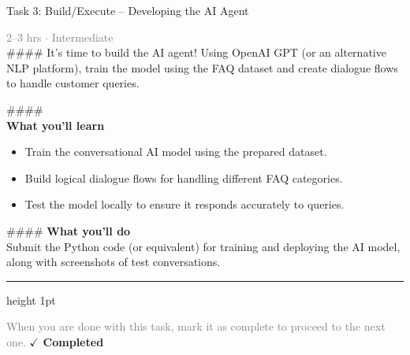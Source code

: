 \documentclass[10pt,a4paper]{article}
\begin{document}
\begin{taskbox}{Task 3: Build/Execute – Developing the AI Agent}

    {\small \textcolor{gray}{2--3 hrs $\cdot$ Intermediate}}\\[12pt]

    \#\#\#\# 
It’s time to build the AI agent! Using OpenAI GPT (or an alternative NLP platform), train the model using the FAQ dataset and create dialogue flows to handle customer queries.

\#\#\#\# \\[10pt]
\vspace{8pt}
{\large \textbf{\textcolor{brandLight}{What you'll learn}}}\\[4pt]
\begin{itemize}
    \item Train the conversational AI model using the prepared dataset.
    \item Build logical dialogue flows for handling different FAQ categories.
    \item Test the model locally to ensure it responds accurately to queries.
\end{itemize}

\#\#\#\# \vspace{8pt}
{\large \textbf{\textcolor{brandLight}{What you'll do}}}\\[4pt]
Submit the Python code (or equivalent) for training and deploying the AI model, along with screenshots of test conversations.\par

    \vspace{16pt}

    \textcolor{cardBorder}{\hrule height 1pt}\vspace{8pt}

    \small \textcolor{gray}{When you are done with this task, mark it as complete to proceed to the next one.} \hfill \textbf{\textcolor{brandDark}{$\checkmark$ Completed}}

\end{taskbox}
\end{document}
